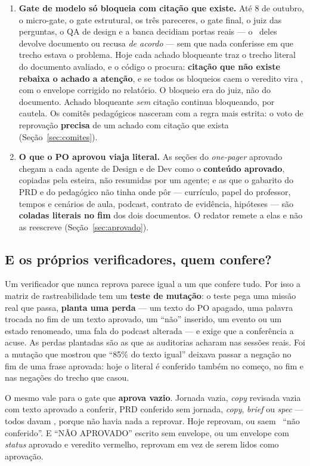 \documentclass[11pt,a4paper]{article}
\newcommand{\bolinha}[1]{\tikz[baseline=-0.5ex]{\fill[#1] (0,0) circle (0.33em);}}
\newcommand{\statusVerde}{\bolinha{sinalVerde}}
\newcommand{\statusAmbar}{\bolinha{sinalAmbar}}
\newcommand{\statusVermelho}{\bolinha{sinalVermelho}}
\begin{document}
\begin{enumerate}
  \item \textbf{Gate de modelo só bloqueia com citação que existe.} Até 8 de outubro, o micro-gate, o gate estrutural, os três pareceres, o gate final, o juiz das perguntas, o QA de design e a banca decidiam portas reais --- o \statusVermelho\ deles devolve documento ou recusa \emph{de acordo} --- sem que nada conferisse em que trecho estava o problema. Hoje cada achado bloqueante traz o trecho literal do documento avaliado, e o código o procura: \textbf{citação que não existe rebaixa o achado a atenção}, e se todos os bloqueios caem o veredito vira \statusAmbar, com o envelope corrigido no relatório. O bloqueio era do juiz, não do documento. Achado bloqueante \emph{sem} citação continua bloqueando, por cautela. Os comitês pedagógicos nasceram com a regra mais estrita: o voto de reprovação \textbf{precisa} de um achado com citação que exista (Seção~\ref{sec:comites}).
  \item \textbf{O que o PO aprovou viaja literal.} As seções do \emph{one-pager} aprovado chegam a cada agente de Design e de Dev como o \textbf{conteúdo aprovado}, copiadas pela esteira, não resumidas por um agente; e as que o gabarito do PRD e do pedagógico não tinha onde pôr --- currículo, papel do professor, tempos e cenários de aula, podcast, contrato de evidência, hipóteses --- são \textbf{coladas literais no fim} dos dois documentos. O redator remete a elas e não as reescreve (Seção~\ref{sec:aprovado}).
\end{enumerate}

\subsection{E os próprios verificadores, quem confere?}

Um verificador que nunca reprova parece igual a um que confere tudo. Por isso a matriz de rastreabilidade tem um \textbf{teste de mutação}: o teste pega uma missão real que passa, \textbf{planta uma perda} --- um texto do PO apagado, uma palavra trocada no fim de um texto aprovado, um ``não'' inserido, um evento ou um estado renomeado, uma fala do podcast alterada --- e exige que a conferência a acuse. As perdas plantadas são as que as auditorias acharam nas sessões reais. Foi a mutação que mostrou que ``85\% do texto igual'' deixava passar a negação no fim de uma frase aprovada: hoje o literal é conferido também no começo, no fim e nas negações do trecho que casou.

O mesmo vale para o gate que \textbf{aprova vazio}. Jornada vazia, \emph{copy} revisada vazia com texto aprovado a conferir, PRD conferido sem jornada, \emph{copy}, \emph{brief} ou \emph{spec} --- todos davam \statusVerde, porque não havia nada a reprovar. Hoje reprovam, ou saem \statusAmbar\ ``não conferido''. E ``NÃO APROVADO'' escrito sem envelope, ou um envelope com \emph{status} aprovado e veredito vermelho, reprovam em vez de serem lidos como aprovação.
\end{document}
